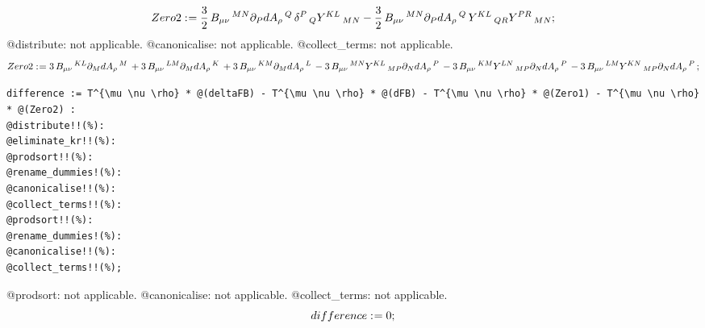\documentclass[11pt]{article}
\def\specialcolon{\mathrel{\mathop{:}}\hspace{-.5em}}
\begin{document}
\begin{dmath*}[compact, spread=2pt]
Zero2\specialcolon{}= \frac{3}{2}\, {B}_{\mu \nu}\,^{M N} {\partial}_{P}{{dA}_{\rho}\,^{Q}}\,  {\delta}^{P}\,_{Q} {Y}^{K L}\,_{M N} - \frac{3}{2}\, {B}_{\mu \nu}\,^{M N} {\partial}_{P}{{dA}_{\rho}\,^{Q}}\,  {Y}^{K L}\,_{Q R} {Y}^{P R}\,_{M N};
\end{dmath*}
@distribute: not applicable.
@canonicalise: not applicable.
@collect\_terms: not applicable.
\begin{dmath*}[compact, spread=2pt]
Zero2\specialcolon{}= 3\, {B}_{\mu \nu}\,^{K L} {\partial}_{M}{{dA}_{\rho}\,^{M}}\,  + 3\, {B}_{\mu \nu}\,^{L M} {\partial}_{M}{{dA}_{\rho}\,^{K}}\,  + 3\, {B}_{\mu \nu}\,^{K M} {\partial}_{M}{{dA}_{\rho}\,^{L}}\,  - 3\, {B}_{\mu \nu}\,^{M N} {Y}^{K L}\,_{M P} {\partial}_{N}{{dA}_{\rho}\,^{P}}\,  - 3\, {B}_{\mu \nu}\,^{K M} {Y}^{L N}\,_{M P} {\partial}_{N}{{dA}_{\rho}\,^{P}}\,  - 3\, {B}_{\mu \nu}\,^{L M} {Y}^{K N}\,_{M P} {\partial}_{N}{{dA}_{\rho}\,^{P}}\, ;
\end{dmath*}
{\color[named]{Blue}\begin{verbatim}
difference := T^{\mu \nu \rho} * @(deltaFB) - T^{\mu \nu \rho} * @(dFB) - T^{\mu \nu \rho} * @(Zero1) - T^{\mu \nu \rho} * @(Zero2) :
@distribute!!(%):
@eliminate_kr!!(%):
@prodsort!!(%):
@rename_dummies!(%):
@canonicalise!!(%):
@collect_terms!!(%):
@prodsort!!(%):
@rename_dummies!(%):
@canonicalise!!(%):
@collect_terms!!(%);
\end{verbatim}}
@prodsort: not applicable.
@canonicalise: not applicable.
@collect\_terms: not applicable.
\begin{dmath*}[compact, spread=2pt]
difference\specialcolon{}= 0;
\end{dmath*}
\end{document}

